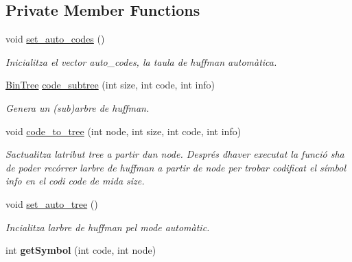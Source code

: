 \subsection*{Private Member Functions}
\begin{DoxyCompactItemize}
\item 
\mbox{\label{classdomini_1_1algorithm_1_1Huffman_a82b44a2aaa1d3726263a79a6562b7a6f}} 
void \hyperlink{classdomini_1_1algorithm_1_1Huffman_a82b44a2aaa1d3726263a79a6562b7a6f}{set\+\_\+auto\+\_\+codes} ()
\begin{DoxyCompactList}\small\item\em Inicialitza el vector auto\+\_\+codes, la taula de huffman automàtica. \end{DoxyCompactList}\item 
\hyperlink{classdomini_1_1utils_1_1BinTree}{Bin\+Tree} \hyperlink{classdomini_1_1algorithm_1_1Huffman_acd2537482f8d719bb37c23ba2d8ec0b1}{code\+\_\+subtree} (int size, int code, int info)
\begin{DoxyCompactList}\small\item\em Genera un (sub)arbre de huffman. \end{DoxyCompactList}\item 
void \hyperlink{classdomini_1_1algorithm_1_1Huffman_a3337f12f1de140551c5a68cb7bab5126}{code\+\_\+to\+\_\+tree} (int node, int size, int code, int info)
\begin{DoxyCompactList}\small\item\em S\textquotesingle{}actualitza l\textquotesingle{}atribut \textquotesingle{}tree\textquotesingle{} a partir d\textquotesingle{}un node. Després d\textquotesingle{}haver executat la funció s\textquotesingle{}ha de poder recórrer l\textquotesingle{}arbre de huffman a partir de node per trobar codificat el símbol \textquotesingle{}info\textquotesingle{} en el codi \textquotesingle{}code\textquotesingle{} de mida \textquotesingle{}size\textquotesingle{}. \end{DoxyCompactList}\item 
\mbox{\label{classdomini_1_1algorithm_1_1Huffman_a688b01855a68e8de4fb75f47dd775fe6}} 
void \hyperlink{classdomini_1_1algorithm_1_1Huffman_a688b01855a68e8de4fb75f47dd775fe6}{set\+\_\+auto\+\_\+tree} ()
\begin{DoxyCompactList}\small\item\em Incialitza l\textquotesingle{}arbre de huffman pel mode automàtic. \end{DoxyCompactList}\item 
\mbox{\label{classdomini_1_1algorithm_1_1Huffman_ad1dafb062b641d7294fa057c3a7d053e}} 
int {\bfseries get\+Symbol} (int code, int node)
\end{DoxyCompactItemize}
